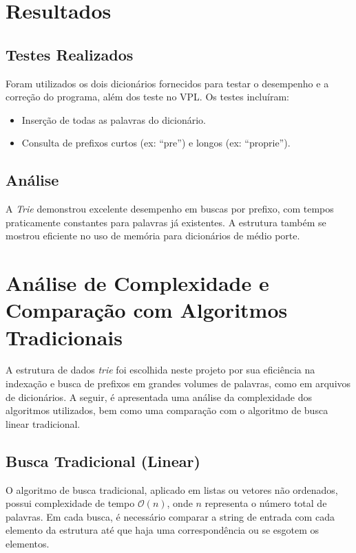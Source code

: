 \documentclass[12pt]{article}
\begin{document}
\section{Resultados}

\subsection{Testes Realizados}

Foram utilizados os dois dicionários fornecidos para testar o desempenho e a correção do programa, além dos teste no VPL. Os testes incluíram:

\begin{itemize}
    \item Inserção de todas as palavras do dicionário.
    \item Consulta de prefixos curtos (ex: ``pre'') e longos (ex: ``proprie'').
\end{itemize}

\subsection{Análise}

A \textit{Trie} demonstrou excelente desempenho em buscas por prefixo, com tempos praticamente constantes para palavras já existentes. A estrutura também se mostrou eficiente no uso de memória para dicionários de médio porte.

\section{Análise de Complexidade e Comparação com Algoritmos Tradicionais}

A estrutura de dados \textit{trie} foi escolhida neste projeto por sua eficiência na indexação e busca de prefixos em grandes volumes de palavras, como em arquivos de dicionários. A seguir, é apresentada uma análise da complexidade dos algoritmos utilizados, bem como uma comparação com o algoritmo de busca linear tradicional.

\subsection{Busca Tradicional (Linear)}

O algoritmo de busca tradicional, aplicado em listas ou vetores não ordenados, possui complexidade de tempo $\mathcal{O}(n)$, onde $n$ representa o número total de palavras. Em cada busca, é necessário comparar a string de entrada com cada elemento da estrutura até que haja uma correspondência ou se esgotem os elementos.
\end{document}
